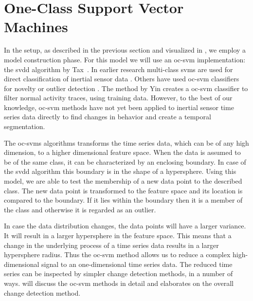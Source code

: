 \section{One-Class Support Vector Machines}\label{sec:intro_ocsvm}
In the setup, as described in the previous section and visualized in , we employ a model construction phase.
For this model we will use an \acrlong{oc-svm} implementation: the \acrlong{svdd} algorithm by Tax~\cite{tax2001one}.
In earlier research multi-class \glspl{svm} are used for direct classification of inertial sensor data \cite{he2008activity,mountrakis2011support,anguita2012human}.
Others have used \gls{oc-svm} classifiers for novelty or outlier detection \cite{scholkopf1999support,camci2010change,li2003improving,ma2003time,tax1999support}.
The method by Yin \etal  \cite{yin2008sensor} creates a \gls{oc-svm} classifier to filter normal activity traces, using training data.
However, to the best of our knowledge, \gls{oc-svm} methods have not yet been applied to inertial sensor time series data directly to find changes in behavior and create a temporal segmentation.

The \glspl{oc-svm} algorithms transforms the time series data, which can be of any high dimension, to a higher dimensional feature space.
When the data is assumed to be of the same class, it can be characterized by an enclosing boundary.
In case of the \gls{svdd} algorithm this boundary is in the shape of a hypersphere.
Using this model, we are able to test the membership of a new data point to the described class.
The new data point is transformed to the feature space and its location is compared to the boundary.
If it lies within the boundary then it is a member of the class and otherwise it is regarded as an outlier.

In case the data distribution changes, the data points will have a larger variance.
It will result in a larger hypersphere in the feature space.
This means that a change in the underlying process of a time series data results in a larger hypersphere radius.
Thus the \gls{oc-svm} method allows us to reduce a complex high-dimensional signal to an one-dimensional time series data.
The reduced time series can be inspected by simpler change detection methods, in a number of ways.
 will discuss the \gls{oc-svm} methods in detail and  elaborates on the overall change detection method.

